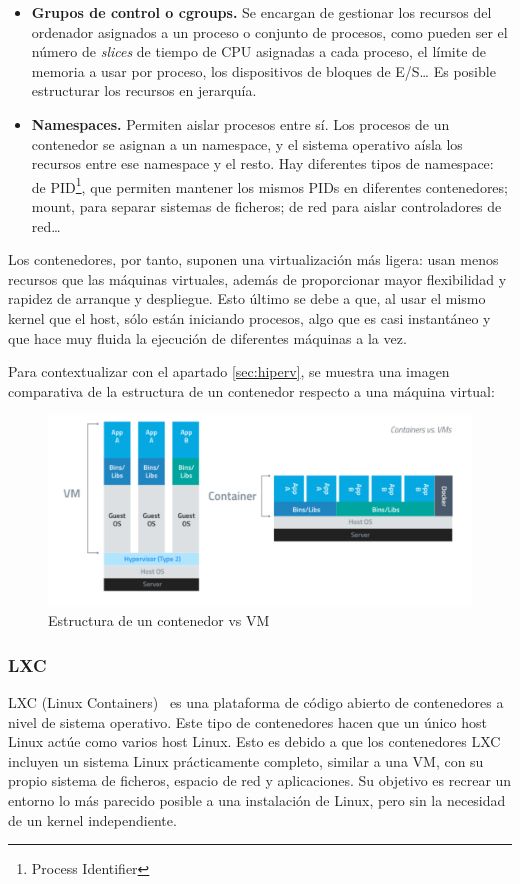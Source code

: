 \begin{itemize}
	\item \textbf{Grupos de control o cgroups.} Se encargan de gestionar los recursos del ordenador asignados a un proceso o conjunto de procesos, como pueden ser el número de \textit{slices} de tiempo de CPU asignadas a cada proceso, el límite de memoria a usar por proceso, los dispositivos de bloques de E/S… Es posible estructurar los recursos en jerarquía.
	\item \textbf{Namespaces.} Permiten aislar procesos entre sí. Los procesos de un contenedor se asignan a un namespace, y el sistema operativo aísla los recursos entre ese namespace y el resto. Hay diferentes tipos de namespace: de PID\footnote{Process Identifier}, que permiten mantener los mismos PIDs en diferentes contenedores; mount, para separar sistemas de ficheros; de red para aislar controladores de red… 
\end{itemize}

Los contenedores, por tanto, suponen una virtualización más ligera: usan menos recursos que las máquinas virtuales, además de proporcionar mayor flexibilidad y rapidez de arranque y despliegue. Esto último se debe a que, al usar el mismo kernel que el host, sólo están iniciando procesos, algo que es casi instantáneo y que hace muy fluida la ejecución de diferentes máquinas a la vez.

Para contextualizar con el apartado \ref{sec:hiperv}, se muestra una imagen comparativa de la estructura de un contenedor respecto a una máquina virtual:

\begin{figure}[h]
\centering
\includegraphics[width=\textwidth]{../imgs/EdA/VMvsCont.png}
\caption{Estructura de un contenedor vs VM}
\label{fig:VMvsDocker}
\end{figure}

\subsubsection{LXC}
LXC (Linux Containers)~\cite{lxc} es una plataforma de código abierto de contenedores a nivel de sistema operativo. Este tipo de contenedores hacen que un único host Linux actúe como varios host Linux. Esto es debido a que los contenedores LXC incluyen un sistema Linux prácticamente completo, similar a una VM, con su propio sistema de ficheros, espacio de red y aplicaciones. Su objetivo es recrear un entorno lo más parecido posible a una instalación de Linux, pero sin la necesidad de un kernel independiente. 

